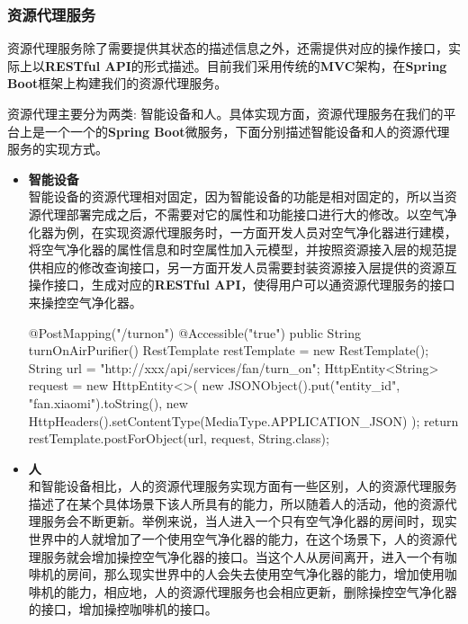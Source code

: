 \documentclass[a4paper]{article}
\theoremstyle{definition}
\begin{document}
\subsubsection{资源代理服务}

资源代理服务除了需要提供其状态的描述信息之外，还需提供对应的操作接口，实际上以\textbf{RESTful API}的形式描述。目前我们采用传统的\textbf{MVC}架构，在\textbf{Spring Boot}框架上构建我们的资源代理服务。

资源代理主要分为两类: 智能设备和人。具体实现方面，资源代理服务在我们的平台上是一个一个的\textbf{Spring Boot}微服务，下面分别描述智能设备和人的资源代理服务的实现方式。

\begin{itemize}
	\item{\textbf{智能设备}}\\
	智能设备的资源代理相对固定，因为智能设备的功能是相对固定的，所以当资源代理部署完成之后，不需要对它的属性和功能接口进行大的修改。以空气净化器为例，在实现资源代理服务时，一方面开发人员对空气净化器进行建模，将空气净化器的属性信息和时空属性加入元模型，并按照资源接入层的规范提供相应的修改查询接口，另一方面开发人员需要封装资源接入层提供的资源互操作接口，生成对应的\textbf{RESTful API}，使得用户可以通资源代理服务的接口来操控空气净化器。
\begin{scala}
    @PostMapping("/turnon")
    @Accessible("true")
    public String turnOnAirPurifier(){
        RestTemplate restTemplate = new RestTemplate();
        String url = "http://xxx/api/services/fan/turn_on";
        HttpEntity<String> request = new HttpEntity<>(
            new JSONObject().put("entity_id", "fan.xiaomi").toString(), 
            new HttpHeaders().setContentType(MediaType.APPLICATION_JSON)
        );
        return restTemplate.postForObject(url, request, String.class);
    }
\end{scala}
    \item{\textbf{人}}\\
    和智能设备相比，人的资源代理服务实现方面有一些区别，人的资源代理服务描述了在某个具体场景下该人所具有的能力，所以随着人的活动，他的资源代理服务会不断更新。举例来说，当人进入一个只有空气净化器的房间时，现实世界中的人就增加了一个使用空气净化器的能力，在这个场景下，人的资源代理服务就会增加操控空气净化器的接口。当这个人从房间离开，进入一个有咖啡机的房间，那么现实世界中的人会失去使用空气净化器的能力，增加使用咖啡机的能力，相应地，人的资源代理服务也会相应更新，删除操控空气净化器的接口，增加操控咖啡机的接口。
\end{itemize}
\end{document}
